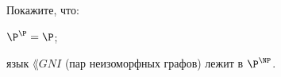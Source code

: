 Покажите, что:
\begin{enumcyr}
    \item $\P^{\P} = \P$;
    \item язык $\lang{GNI}$ (пар неизоморфных графов) лежит в $\P^{\NP}$.
\end{enumcyr}